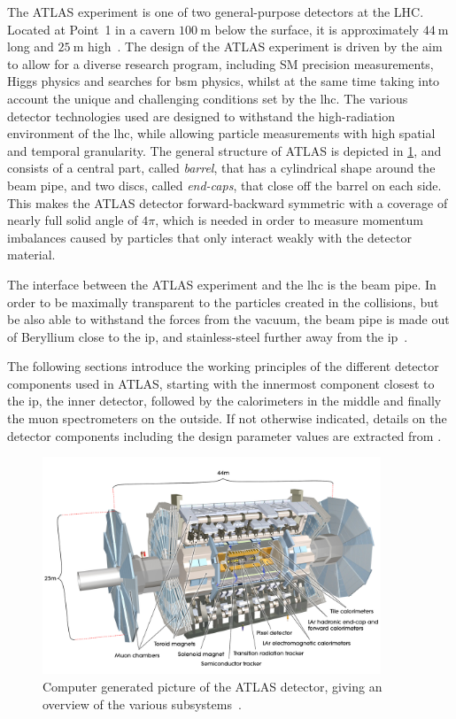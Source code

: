 The ATLAS experiment is one of two general-purpose detectors at the LHC. Located at Point~1 in a cavern $\SI{100}{\meter}$ below the surface, it is approximately $\SI{44}{\meter}$ long and $\SI{25}{\meter}$ high~\cite{Aad:2008zzm}.
The design of the ATLAS experiment is driven by the aim to allow for a diverse research program, including SM precision measurements, Higgs physics and searches for \gls{bsm} physics, whilst at the same time taking into account the unique and challenging conditions set by the \gls{lhc}.
The various detector technologies used are designed to withstand the high-radiation environment of the \gls{lhc}, while allowing particle measurements with high spatial and temporal granularity.
The general structure of ATLAS is depicted in \cref{fig:atlas_detector}, and consists of a central part, called \textit{barrel}, that has a cylindrical shape around the beam pipe, and two discs, called \textit{end-caps}, that close off the barrel on each side.
This makes the ATLAS detector forward-backward symmetric with a coverage of nearly full solid angle of $4\pi$, which is needed in order to measure momentum imbalances caused by particles that only interact weakly with the detector material.

The interface between the ATLAS experiment and the \gls{lhc} is the beam pipe.
In order to be maximally transparent to the particles created in the collisions, but be also able to withstand the forces from the vacuum, the beam pipe is made out of Beryllium close to the \gls{ip}, and stainless-steel further away from the \gls{ip}~\cite{Brock:1354959}.

The following sections introduce the working principles of the different detector components used in ATLAS, starting with the innermost component closest to the \gls{ip}, the inner detector, followed by the calorimeters in the middle and finally the muon spectrometers on the outside. If not otherwise indicated, details on the detector components including the design parameter values are extracted from \cite{Aad:2008zzm}.

\begin{figure}
	\centering    
	\includegraphics[width=0.9\textwidth]{atlas}
	\caption[The ATLAS detector]{Computer generated picture of the ATLAS detector, giving an overview of the various subsystems~\cite{Pequenao:1095924}.}
	\label{fig:atlas_detector}
\end{figure}


